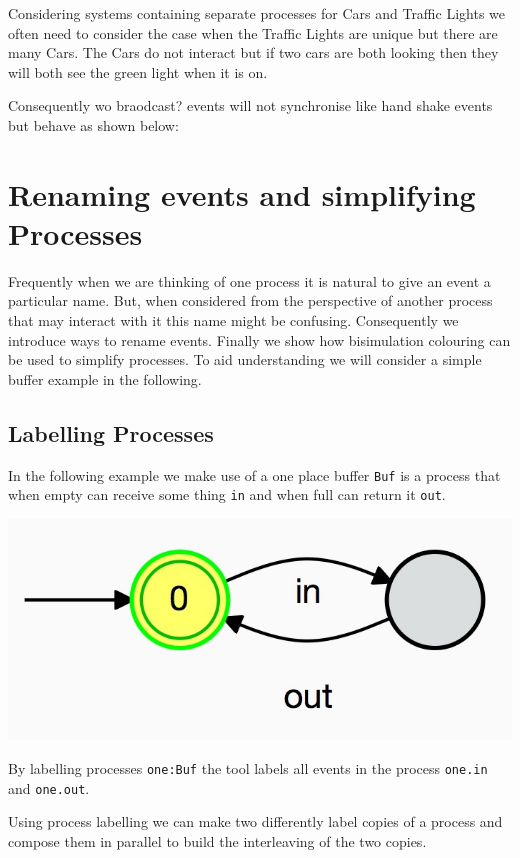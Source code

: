\documentclass[]{article}
\begin{document}
Considering systems containing separate processes for  {\sf Cars} and {\sf Traffic Lights} we often need to consider the case when the {\sf Traffic Lights} are unique but there are many {\sf Cars}.  The {\sf Cars} do not interact but if two cars are both looking then they will both see the green light when it is on.

Consequently wo  {\sf braodcast?} events will not synchronise  like  hand shake events but behave as shown below:




\section{ Renaming events and simplifying Processes}
Frequently when we are thinking of one process it is natural to give an event a particular name. But, when considered from the perspective of another process that may interact with it this name might be confusing. Consequently we introduce ways to rename events.
Finally we show how bisimulation colouring can be used to simplify processes. To aid understanding we will consider a simple buffer example in the following.
\subsection{Labelling Processes}
In the following example we make use of a one place buffer \verb$Buf$ is a process that when empty can receive some thing \verb$in$ and when full can return it \verb$out$.
\noindent\begin{center} \includegraphics[scale=0.15]{Buf.jpg} \end{center}
By labelling  processes  \verb$one:Buf$ the tool  labels all events in the process \verb$one.in$ and \verb$one.out$.

Using process labelling we can make two differently label copies of a process and compose them in parallel to build the interleaving of the two copies.
\end{document}
